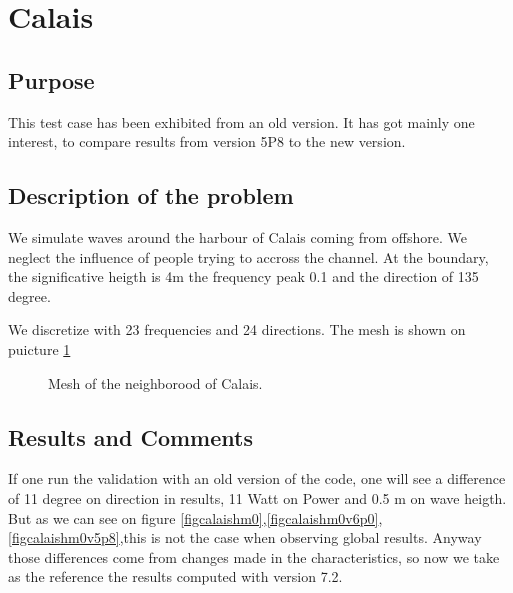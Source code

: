 \section{Calais}
%
%
\subsection{Purpose}
%
This test case has been exhibited from an old version. It has got mainly one interest, to compare results from version 5P8 to the new version.  

%
\subsection{Description of the problem}
We simulate waves around the harbour of Calais coming from offshore. We neglect the influence of people trying to accross the channel.
At the boundary, the significative heigth is 4m the frequency peak 0.1 and the direction of 135 degree.

We discretize with 23 frequencies and 24 directions. The mesh is shown on puicture \ref{figcalaismesh}

\begin{figure} [!h]
\centering
{}
 \caption{Mesh of the neighborood of Calais. }
\label{figcalaismesh}
\end{figure}

\subsection{Results and Comments}

If one run the validation with an old version of the code, one will see a difference of 11 degree on direction in results, 11 Watt on Power and 0.5 m on wave heigth. But as we can see on figure  \ref{figcalaishm0},\ref{figcalaishm0v6p0}, \ref{figcalaishm0v5p8},this is not the case when observing global results. Anyway those differences come from changes made in the characteristics, so now we take as the reference the results computed with version 7.2. 

